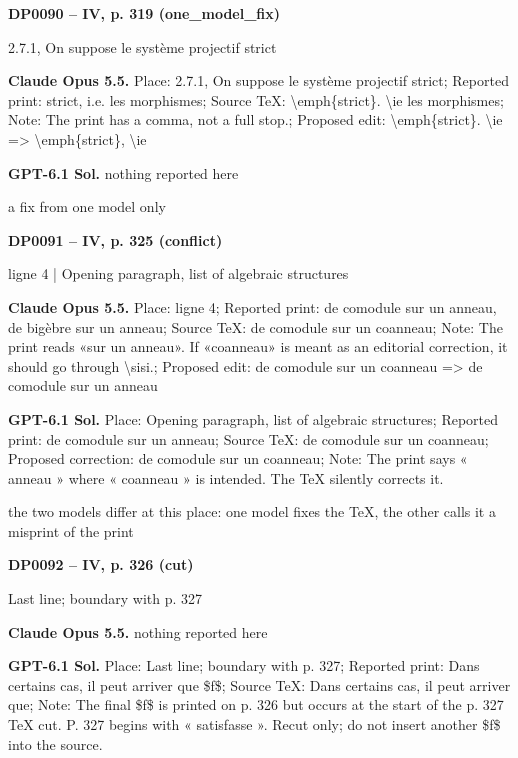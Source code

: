 \par\noindent\hypertarget{DP0090}{}\textbf{DP0090 -- IV, p. 319 (one\_model\_fix)}\par
2.7.1, On suppose le système projectif strict\par
\textbf{Claude Opus 5.5.} Place: 2.7.1, On suppose le système projectif strict; Reported print: strict, i.e. les morphismes; Source TeX: \textbackslash{}emph\{strict\}. \textbackslash{}ie les morphismes; Note: The print has a comma, not a full stop.; Proposed edit: \textbackslash{}emph\{strict\}. \textbackslash{}ie =\allowbreak > \textbackslash{}emph\{strict\}, \textbackslash{}ie\par
\textbf{GPT-6.1 Sol.} nothing reported here\par
a fix from one model only\par
\par\noindent\hypertarget{DP0091}{}\textbf{DP0091 -- IV, p. 325 (conflict)}\par
ligne 4 | Opening paragraph, list of algebraic structures\par
\textbf{Claude Opus 5.5.} Place: ligne 4; Reported print: de comodule sur un anneau, de bigèbre sur un anneau; Source TeX: de comodule sur un coanneau; Note: The print reads «sur un anneau». If «coanneau» is meant as an editorial correction, it should go through \textbackslash{}sisi.; Proposed edit: de comodule sur un coanneau =\allowbreak > de comodule sur un anneau\par
\textbf{GPT-6.1 Sol.} Place: Opening paragraph, list of algebraic structures; Reported print: de comodule sur un anneau; Source TeX: de comodule sur un coanneau; Proposed correction: de comodule sur un coanneau; Note: The print says « anneau » where « coanneau » is intended. The TeX silently corrects it.\par
the two models differ at this place: one model fixes the TeX, the other calls it a misprint of the print\par
\par\noindent\hypertarget{DP0092}{}\textbf{DP0092 -- IV, p. 326 (cut)}\par
Last line; boundary with p. 327\par
\textbf{Claude Opus 5.5.} nothing reported here\par
\textbf{GPT-6.1 Sol.} Place: Last line; boundary with p. 327; Reported print: Dans certains cas, il peut arriver que \$f\$; Source TeX: Dans certains cas, il peut arriver que; Note: The final \$f\$ is printed on p. 326 but occurs at the start of the p. 327 TeX cut. P. 327 begins with « satisfasse ». Recut only; do not insert another \$f\$ into the source.\par
